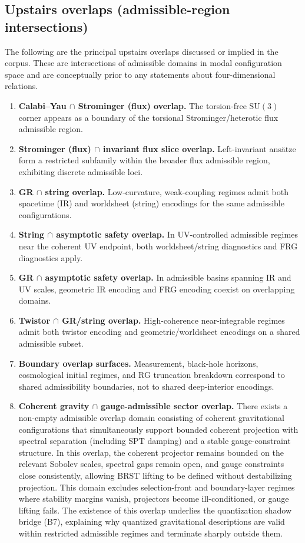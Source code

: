 \documentclass[11pt]{article}
\begin{document}
\subsection{Upstairs overlaps (admissible-region intersections)}
The following are the principal upstairs overlaps discussed or implied in the corpus. These are intersections of admissible
domains in modal configuration space and are conceptually prior to any statements about four-dimensional relations.

\begin{enumerate}[label=\textbf{O\arabic*}]
\item \textbf{Calabi--Yau $\cap$ Strominger (flux) overlap.} The torsion-free $\mathrm{SU}(3)$ corner appears as a boundary of the torsional Strominger/heterotic flux admissible region.
\item \textbf{Strominger (flux) $\cap$ invariant flux slice overlap.} Left-invariant ans\"atze form a restricted subfamily within the broader flux admissible region, exhibiting discrete admissible loci.
\item \textbf{GR $\cap$ string overlap.} Low-curvature, weak-coupling regimes admit both spacetime (IR) and worldsheet (string) encodings for the same admissible configurations.
\item \textbf{String $\cap$ asymptotic safety overlap.} In UV-controlled admissible regimes near the coherent UV endpoint, both worldsheet/string diagnostics and FRG diagnostics apply.
\item \textbf{GR $\cap$ asymptotic safety overlap.} In admissible basins spanning IR and UV scales, geometric IR encoding and FRG encoding coexist on overlapping domains.
\item \textbf{Twistor $\cap$ GR/string overlap.} High-coherence near-integrable regimes admit both twistor encoding and geometric/worldsheet encodings on a shared admissible subset.
\item \textbf{Boundary overlap surfaces.} Measurement, black-hole horizons, cosmological initial regimes, and RG truncation breakdown correspond to shared admissibility boundaries, not to shared deep-interior encodings.
\item \textbf{Coherent gravity $\cap$ gauge-admissible sector overlap.}
There exists a non-empty admissible overlap domain consisting of coherent gravitational
configurations that simultaneously support bounded coherent projection with spectral
separation (including SPT damping) and a stable gauge-constraint structure. In this overlap,
the coherent projector remains bounded on the relevant Sobolev scales, spectral gaps remain
open, and gauge constraints close consistently, allowing BRST lifting to be defined without
destabilizing projection. This domain excludes selection-front and boundary-layer regimes
where stability margins vanish, projectors become ill-conditioned, or gauge lifting fails.
The existence of this overlap underlies the quantization shadow bridge (B7), explaining
why quantized gravitational descriptions are valid within restricted admissible regimes and
terminate sharply outside them.

\end{enumerate}
\end{document}
